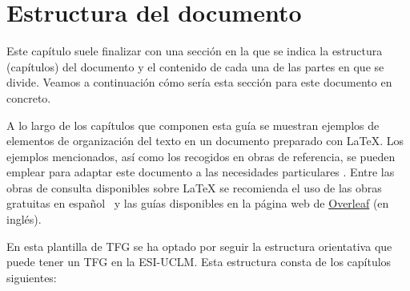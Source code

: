 

\section{Estructura del documento}
Este capítulo suele finalizar con una sección en la que se indica la estructura (capítulos) del documento y el contenido de cada una de las partes en que se divide. Veamos a continuación cómo sería esta sección para este documento en concreto.

A lo largo de los capítulos que componen esta guía se muestran ejemplos de elementos de organización del texto en un documento preparado con \LaTeX{}. Los ejemplos mencionados, así como los recogidos en obras de referencia, se pueden emplear para adaptar este documento a las necesidades particulares  \cite{lamport94,wikibookLaTex10}. Entre las obras de consulta disponibles sobre \LaTeX{} se recomienda el uso de las obras gratuitas en español~\cite{oetiker14,borbon21} y las guías disponibles en la página web de \href{https://es.overleaf.com/learn}{Overleaf} (en inglés).

En esta plantilla de TFG se ha optado por seguir la estructura orientativa que puede tener un TFG en la \mbox{ESI-UCLM}. Esta estructura consta de los capítulos siguientes:

